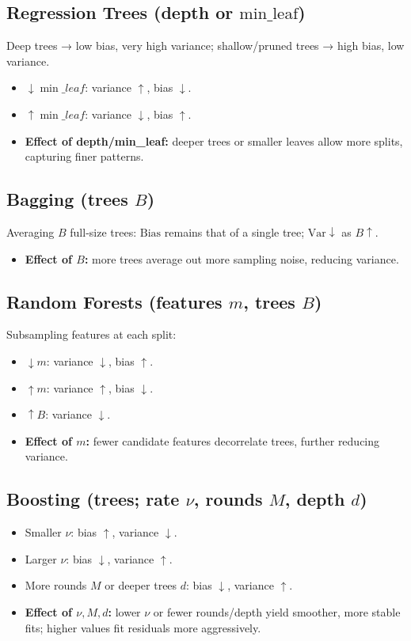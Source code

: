 \documentclass{article}
\begin{document}
\subsection{Regression Trees (depth or \(\text{min\_leaf}\))}
Deep trees → low bias, very high variance; shallow/pruned trees → high bias, low variance.
\begin{itemize}
  \item \(\downarrow\min\_leaf\): variance \(\uparrow\), bias \(\downarrow\).
  \item \(\uparrow\min\_leaf\): variance \(\downarrow\), bias \(\uparrow\).
  \item \textbf{Effect of depth/min\_leaf:} deeper trees or smaller leaves allow more splits, capturing finer patterns.
\end{itemize}

\subsection{Bagging (trees \(B\))}
Averaging \(B\) full-size trees: \(\mathrm{Bias}\) remains that of a single tree; \(\mathrm{Var}\downarrow\) as \(B\uparrow\).
\begin{itemize}
  \item \textbf{Effect of \(B\):} more trees average out more sampling noise, reducing variance.
\end{itemize}

\subsection{Random Forests (features \(m\), trees \(B\))}
Subsampling features at each split:
\begin{itemize}
  \item \(\downarrow m\): variance \(\downarrow\), bias \(\uparrow\).
  \item \(\uparrow m\): variance \(\uparrow\), bias \(\downarrow\).
  \item \(\uparrow B\): variance \(\downarrow\).
  \item \textbf{Effect of \(m\):} fewer candidate features decorrelate trees, further reducing variance.
\end{itemize}

\subsection{Boosting (trees; rate \(\nu\), rounds \(M\), depth \(d\))}
\begin{itemize}
  \item Smaller \(\nu\): bias \(\uparrow\), variance \(\downarrow\).
  \item Larger \(\nu\): bias \(\downarrow\), variance \(\uparrow\).
  \item More rounds \(M\) or deeper trees \(d\): bias \(\downarrow\), variance \(\uparrow\).
  \item \textbf{Effect of \(\nu, M, d\):} lower \(\nu\) or fewer rounds/depth yield smoother, more stable fits; higher values fit residuals more aggressively.
\end{itemize}
\end{document}
